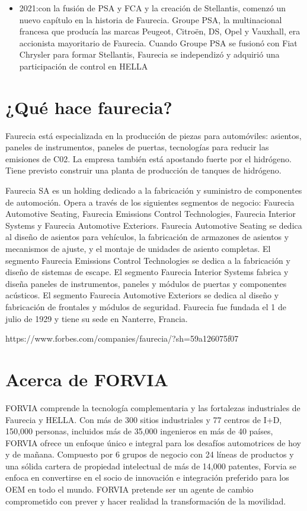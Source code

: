 \documentclass[letterpaper,12pt]{article}
\begin{document}
\begin{sloppypar}
\begin{itemize}
    \item 2021:con la fusión de PSA y FCA y la creación de Stellantis, comenzó un nuevo capítulo en la historia de Faurecia. Groupe PSA, la multinacional francesa que producía las marcas Peugeot, Citroën, DS, Opel y Vauxhall, era accionista mayoritario de Faurecia. Cuando Groupe PSA se fusionó con Fiat Chrysler para formar Stellantis, Faurecia se independizó y adquirió una participación de control en HELLA
\end{itemize}

\section*{¿Qué hace faurecia?}
Faurecia está especializada en la producción de piezas para automóviles: asientos, paneles de instrumentos, paneles de puertas, tecnologías para reducir las emisiones de C02. La empresa también está apostando fuerte por el hidrógeno. Tiene previsto construir una planta de producción de tanques de hidrógeno.

Faurecia SA es un holding dedicado a la fabricación y suministro de componentes de automoción. Opera a través de los siguientes segmentos de negocio: Faurecia Automotive Seating, Faurecia Emissions Control Technologies, Faurecia Interior Systems y Faurecia Automotive Exteriors. Faurecia Automotive Seating se dedica al diseño de asientos para vehículos, la fabricación de armazones de asientos y mecanismos de ajuste, y el montaje de unidades de asiento completas. El segmento Faurecia Emissions Control Technologies se dedica a la fabricación y diseño de sistemas de escape. El segmento Faurecia Interior Systems fabrica y diseña paneles de instrumentos, paneles y módulos de puertas y componentes acústicos. El segmento Faurecia Automotive Exteriors se dedica al diseño y fabricación de frontales y módulos de seguridad. Faurecia fue fundada el 1 de julio de 1929 y tiene su sede en Nanterre, Francia. 

https://www.forbes.com/companies/faurecia/?sh=59a126075f07




\section*{Acerca de FORVIA}
FORVIA comprende la tecnología complementaria y las fortalezas industriales de Faurecia y HELLA. Con más de 300 sitios industriales y 77 centros de I+D, 150,000 personas, incluidos más de 35,000 ingenieros en más de 40 países, FORVIA ofrece un enfoque único e integral para los desafíos automotrices de hoy y de mañana. Compuesto por 6 grupos de negocio con 24 líneas de productos y una sólida cartera de propiedad intelectual de más de 14,000 patentes, Forvia se enfoca en convertirse en el socio de innovación e integración preferido para los OEM en todo el mundo. FORVIA pretende ser un agente de cambio comprometido con prever y hacer realidad la transformación de la movilidad.




\end{sloppypar}
\end{document}
